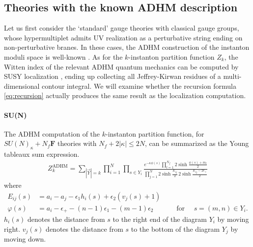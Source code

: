 \documentclass[letterpaper, 11pt]{article}
\def\e{\epsilon}
\begin{document}
{\subsection{Theories with the known ADHM description}
\label{subsec:ex-adhm}

Let us first consider the `standard' gauge theories with classical gauge groups, whose hypermultiplet admits UV realization as a perturbative string ending on non-perturbative branes. In these cases, the ADHM construction of the instanton moduli space is well-known \cite{Atiyah:1978ri,Nekrasov:2002qd,Shadchin:2005mx}. 
As for the $k$-instanton partition function $Z_k$, the Witten index of the relevant ADHM quantum mechanics can be computed by SUSY localization \cite{Kim:2011mv, Hwang:2014uwa,Hwang:2016gfw, Lee:2017lfw}, ending up collecting all Jeffrey-Kirwan residues of a multi-dimensional contour integral. We will examine whether the recursion formula \eqref{eq:recursion} actually produces  the same result as the localization computation.

\paragraph{SU(N)}

The ADHM computation of the $k$-instanton partition function, for $SU(N)_\kappa +N_f \mathbf{F}$ theories with $N_f + 2|\kappa| \leq 2N$, can be summarized as the  Young tableaux sum expression.
\begin{align}
  \label{eq:SUn-young}
  Z_k^\text{ADHM} = \sum_{|\vec{Y}| = k}\prod_{i=1}^N\prod_{s \in Y_i}\frac{e^{-\kappa \phi(s)} \prod_{l=1}^{N_f} 2\sinh{\frac{\phi(s)+m_l}{2}}  }{\prod_{j=1}^N 2\sinh{\frac{E_{ij}}{2}}\,2\sinh{\frac{E_{ij}-2\e_+}{2}}}
\end{align}
where
\begin{align*}
  E_{ij}(s) &= a_i - a_j - \e_1 h_i(s)+ \e_2(v_j(s)+1)\\
  \varphi(s)&= a_i  -\e_+-(n-1)\e_1-(m-1)\e_2
   \quad \qquad\text{ for }\quad s = (m,n) \in Y_i.
\end{align*}
$h_i(s)$ denotes the distance from $s$ to the right end of the diagram $Y_i$ by moving right. $v_j(s)$ denotes the distance from $s$ to the bottom of the diagram $Y_j$ by moving down.

}
\end{document}
